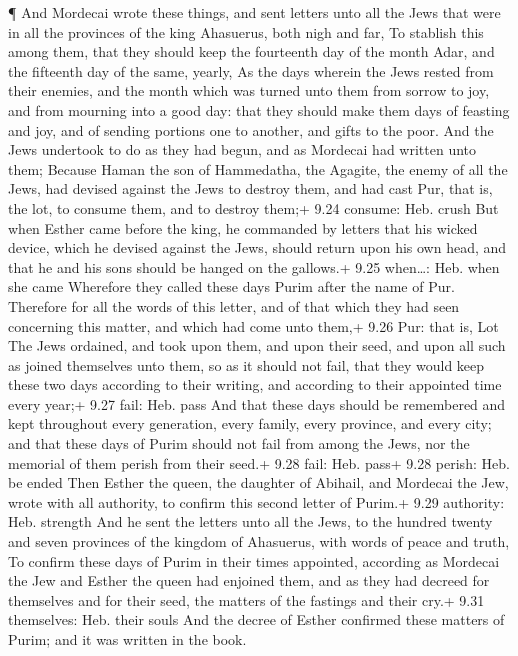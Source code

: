  ¶ And Mordecai wrote these things, and sent letters unto
all the Jews that were in all the provinces of the king Ahasuerus, both
nigh and far,  To stablish this among them, that they
should keep the fourteenth day of the month Adar, and the fifteenth day
of the same, yearly,  As the days wherein the Jews rested
from their enemies, and the month which was turned unto them from sorrow
to joy, and from mourning into a good day: that they should make them
days of feasting and joy, and of sending portions one to another, and
gifts to the poor.  And the Jews undertook to do as they
had begun, and as Mordecai had written unto them;  Because
Haman the son of Hammedatha, the Agagite, the enemy of all the Jews, had
devised against the Jews to destroy them, and had cast Pur, that is, the
lot, to consume them, and to destroy them;+ 9.24 consume: Heb. crush
 But when Esther came before the king, he commanded by
letters that his wicked device, which he devised against the Jews,
should return upon his own head, and that he and his sons should be
hanged on the gallows.+ 9.25 when\ldots: Heb. when she came
 Wherefore they called these days Purim after the name of
Pur. Therefore for all the words of this letter, and of that which they
had seen concerning this matter, and which had come unto them,+ 9.26
Pur: that is, Lot  The Jews ordained, and took upon them,
and upon their seed, and upon all such as joined themselves unto them,
so as it should not fail, that they would keep these two days according
to their writing, and according to their appointed time every year;+
9.27 fail: Heb. pass  And that these days should be
remembered and kept throughout every generation, every family, every
province, and every city; and that these days of Purim should not fail
from among the Jews, nor the memorial of them perish from their seed.+
9.28 fail: Heb. pass+ 9.28 perish: Heb. be ended  Then
Esther the queen, the daughter of Abihail, and Mordecai the Jew, wrote
with all authority, to confirm this second letter of Purim.+ 9.29
authority: Heb. strength  And he sent the letters unto all
the Jews, to the hundred twenty and seven provinces of the kingdom of
Ahasuerus, with words of peace and truth,  To confirm these
days of Purim in their times appointed, according as Mordecai the Jew
and Esther the queen had enjoined them, and as they had decreed for
themselves and for their seed, the matters of the fastings and their
cry.+ 9.31 themselves: Heb. their souls  And the decree of
Esther confirmed these matters of Purim; and it was written in the book.


